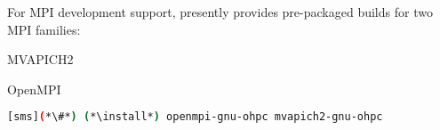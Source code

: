 For MPI development support, \OHPC{} presently provides pre-packaged builds for
two MPI families: 

\begin{itemize*}
\item MVAPICH2
\item OpenMPI

\end{itemize*}

\begin{lstlisting}[language=bash]
[sms](*\#*) (*\install*) openmpi-gnu-ohpc mvapich2-gnu-ohpc
\end{lstlisting}
